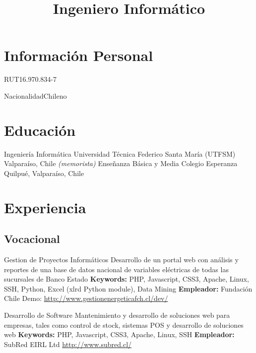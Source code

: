 \documentclass[11pt,a4paper]{moderncv}
\title{Ingeniero Informático}
\begin{document}
\maketitle

\section{Información Personal}

	   {RUT}{16.970.834-7}

	   {Nacionalidad}{Chileno}

\section{Educación}

        {Ingeniería Informática}
        {Universidad Técnica Federico Santa María (UTFSM)}
        {Valparaíso, Chile}
        {\emph{(memorista)}}
        {}
        {Enseñanza Básica y Media}
        {Colegio Esperanza}
        {Quilpué, Valparaíso, Chile}
        {}{}

\section{Experiencia}
\subsection{Vocacional}

        {Gestion de Proyectos Informáticos}
        {Desarrollo de  un portal web con análisis y reportes de una base de datos nacional de variables eléctricas de todas las sucursales de Banco Estado}
        {\textbf{Keywords:} PHP, Javascript, CSS3, Apache, Linux, SSH, Python, Excel (xlrd Python module), Data Mining}
        {\textbf{Empleador:} Fundación Chile}
        {Demo: \url{http://www.gestionenergeticafch.cl/dev/}}

        {Desarrollo de Software}
        {Mantenimiento y desarrollo de soluciones web para empresas, tales como control de stock, sistemas POS y desarrollo de soluciones web}
        {\textbf{Keywords:} PHP, Javascript, CSS3, Apache, Linux, SSH}
        {\textbf{Empleador:} SubRed EIRL Ltd}
        {\url{http://www.subred.cl/}}
\end{document}
